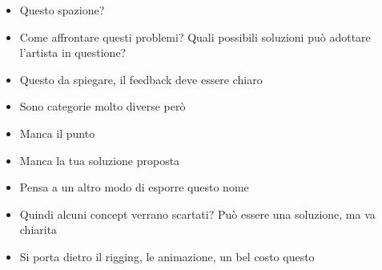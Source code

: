 {\begin{itemize}
  \item \rvVuoto Questo spazione?
  \item {} Come affrontare questi problemi? Quali possibili soluzioni può adottare l'artista in questione?
  \item {} Questo da spiegare, il feedback deve essere chiaro
  \item {} Sono categorie molto diverse però
  \item {} Manca il punto
  \item {} Manca la tua soluzione proposta
  \item {} Pensa a un altro modo di esporre questo nome
  \item {} Quindi alcuni concept verrano scartati? Può essere una soluzione, ma va chiarita
  \item {} Si porta dietro il rigging, le animazione, un bel costo questo
\end{itemize}
}

